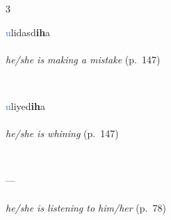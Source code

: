 \documentclass[oneside,openany]{book}%
\begin{document}
\begin{multicols}{3}
\begin{minipage}[t]{\linewidth}
\raggedright\noindent \textcolor{RoyalBlue}{u}lidasd\textbf{ih}a\\
\\
\noindent \textit{he/she is making a mistake} (p.~147)
\end{minipage}\\[1em]%
\begin{minipage}[t]{\linewidth}
\raggedright\noindent \textcolor{RoyalBlue}{u}liyed\textbf{ih}a\\
\\
\noindent \textit{he/she is whining} (p.~147)
\end{minipage}\\[1em]%
\begin{minipage}[t]{\linewidth}
\raggedright\noindent ---\\
\\
\noindent \textit{he/she is listening to him/her} (p.~78)
\end{minipage}\\[1em]%
\end{multicols}%
\vspace{1em}%
\needspace{1.5in}%
\end{document}
